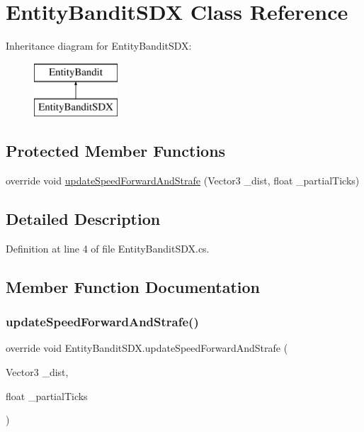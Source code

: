 \hypertarget{class_entity_bandit_s_d_x}{}\section{Entity\+Bandit\+S\+DX Class Reference}
\label{class_entity_bandit_s_d_x}
Inheritance diagram for Entity\+Bandit\+S\+DX\+:\begin{figure}[H]
\begin{center}
\leavevmode
\includegraphics[height=2.000000cm]{d5/da5/class_entity_bandit_s_d_x}
\end{center}
\end{figure}
\subsection*{Protected Member Functions}
\begin{DoxyCompactItemize}
\item 
override void \mbox{\hyperlink{class_entity_bandit_s_d_x_a22ad0f343b839f52f7c0c1c23db3ffc4}{update\+Speed\+Forward\+And\+Strafe}} (Vector3 \+\_\+dist, float \+\_\+partial\+Ticks)
\end{DoxyCompactItemize}


\subsection{Detailed Description}


Definition at line 4 of file Entity\+Bandit\+S\+D\+X.\+cs.



\subsection{Member Function Documentation}
\mbox{\label{class_entity_bandit_s_d_x_a22ad0f343b839f52f7c0c1c23db3ffc4}} 
\subsubsection{\texorpdfstring{updateSpeedForwardAndStrafe()}{updateSpeedForwardAndStrafe()}}
{\footnotesize\ttfamily override void Entity\+Bandit\+S\+D\+X.\+update\+Speed\+Forward\+And\+Strafe (\begin{DoxyParamCaption}\item[{Vector3}]{\+\_\+dist,  }\item[{float}]{\+\_\+partial\+Ticks }\end{DoxyParamCaption})\hspace{0.3cm}{\ttfamily [protected]}}



